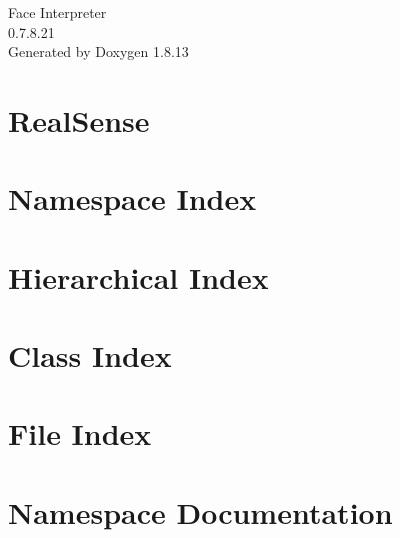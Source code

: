 \documentclass[twoside]{book}
\newcommand{\+}{\discretionary{\mbox{\scriptsize$\hookleftarrow$}}{}{}}
\newcommand{\clearemptydoublepage}{%
  \newpage{\pagestyle{empty}\cleardoublepage}%
}
\begin{document}
\begin{titlepage}
\vspace*{7cm}
\begin{center}%
{\Large Face Interpreter \\[1ex]\large 0.\+7.\+8.\+21 }\\
\vspace*{1cm}
{\large Generated by Doxygen 1.8.13}\\
\end{center}
\end{titlepage}
\clearemptydoublepage
{}
\tableofcontents
\clearemptydoublepage
{}

\chapter{Real\+Sense}
\label{md__r_e_a_d_m_e}

\chapter{Namespace Index}

\chapter{Hierarchical Index}

\chapter{Class Index}

\chapter{File Index}

\chapter{Namespace Documentation}



\end{document}
